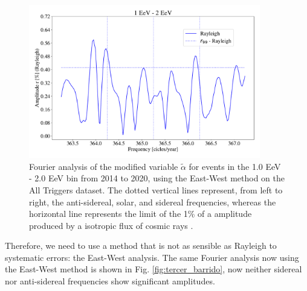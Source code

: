\documentclass[12pt, doublespace, oneside]{article}
\begin{document}
\begin{figure}[H]
    \begin{small}
        \begin{center}
            \vspace*{-0.21 cm}
            \includegraphics[width=0.9\textwidth]{Figs/plot_bin_3_barrido_v3_Ray.pdf}
            \vspace*{-1 cm}
        \end{center}
        \caption{Fourier analysis of the modified variable $\tilde{\alpha}$ for events in the 1.0 EeV - 2.0 EeV bin from 2014 to 2020, using the East-West method on the All Triggers dataset. The dotted vertical lines represent, from left to right, the anti-sidereal, solar, and sidereal frequencies, whereas the horizontal line represents the limit of the 1\% of a amplitude produced by a isotropic flux of cosmic rays .}
        \label{fig:tercer_barrido_Ray}
    \end{small}
\end{figure}    


Therefore, we need to use a method that is not as sensible as Rayleigh to systematic errors: the East-West analysis. The same Fourier analysis now using the East-West method is shown in Fig. \ref{fig:tercer_barrido}, now neither sidereal nor anti-sidereal frequencies show significant amplitudes. 
\end{document}
